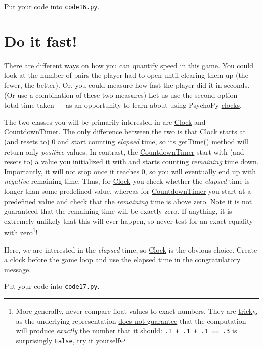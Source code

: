 \documentclass[
]{book}
\begin{document}
Put your code into \texttt{code16.py}.

\hypertarget{do-it-fast}{%
\section{Do it fast!}\label{do-it-fast}}

There are different ways on how you can quantify speed in this game. You could look at the number of pairs the player had to open until clearing them up (the fewer, the better). Or, you could measure how fast the player did it in seconds. (Or use a combination of these two measures) Let us use the second option --- total time taken --- as an opportunity to learn about using PsychoPy \href{https://psychopy.org/api/clock.html}{clocks}.

The two classes you will be primarily interested in are \href{https://psychopy.org/api/clock.html\#psychopy.clock.Clock}{Clock} and \href{https://psychopy.org/api/clock.html\#psychopy.clock.CountdownTimer}{CountdownTimer}. The only difference between the two is that \href{https://psychopy.org/api/clock.html\#psychopy.clock.Clock}{Clock} starts at (and \href{https://psychopy.org/api/clock.html\#psychopy.clock.Clock.reset}{resets} to) 0 and start counting \emph{elapsed} time, so its \href{https://psychopy.org/api/clock.html\#psychopy.clock.MonotonicClock.getTime}{getTime()} method will return only \emph{positive} values. In contrast, the \href{https://psychopy.org/api/clock.html\#psychopy.clock.CountdownTimer}{CountdownTimer} start with (and resets to) a value you initialized it with and starts counting \emph{remaining} time down. Importantly, it will not stop once it reaches 0, so you will eventually end up with \emph{negative} remaining time. Thus, for \href{https://psychopy.org/api/clock.html\#psychopy.clock.Clock}{Clock} you check whether the \emph{elapsed} time is longer than some predefined value, whereas for \href{https://psychopy.org/api/clock.html\#psychopy.clock.CountdownTimer}{CountdownTimer} you start at a predefined value and check that the \emph{remaining} time is above zero. Note it is not guaranteed that the remaining time will be exactly zero. If anything, it is extremely unlikely that this will ever happen, so never test for an exact equality with zero\footnote{More generally, never compare float values to exact numbers. They are \href{http://www.lahey.com/float.htm}{tricky}, as the underlying representation \href{https://docs.python.org/3/tutorial/floatingpoint.html}{does not guarantee} that the computation will produce \emph{exactly} the number that it should: \texttt{.1\ +\ .1\ +\ .1\ ==\ .3} is surprisingly \texttt{False}, try it yourself}!

Here, we are interested in the \emph{elapsed} time, so \href{https://psychopy.org/api/clock.html\#psychopy.clock.Clock}{Clock} is the obvious choice. Create a clock before the game loop and use the elapsed time in the congratulatory message.

Put your code into \texttt{code17.py}.

  
\end{document}

